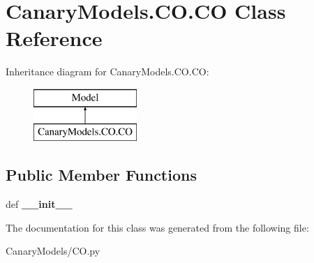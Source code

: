 \hypertarget{class_canary_models_1_1_c_o_1_1_c_o}{\section{Canary\-Models.\-C\-O.\-C\-O Class Reference}
\label{class_canary_models_1_1_c_o_1_1_c_o}
}
Inheritance diagram for Canary\-Models.\-C\-O.\-C\-O\-:\begin{figure}[H]
\begin{center}
\leavevmode
\includegraphics[height=2.000000cm]{class_canary_models_1_1_c_o_1_1_c_o}
\end{center}
\end{figure}
\subsection*{Public Member Functions}
\begin{DoxyCompactItemize}
\item 
\hypertarget{class_canary_models_1_1_c_o_1_1_c_o_af5256a722e68cec80a650442b1e335da}{def {\bfseries \-\_\-\-\_\-init\-\_\-\-\_\-}}\label{class_canary_models_1_1_c_o_1_1_c_o_af5256a722e68cec80a650442b1e335da}

\end{DoxyCompactItemize}


The documentation for this class was generated from the following file\-:\begin{DoxyCompactItemize}
\item 
Canary\-Models/C\-O.\-py\end{DoxyCompactItemize}
